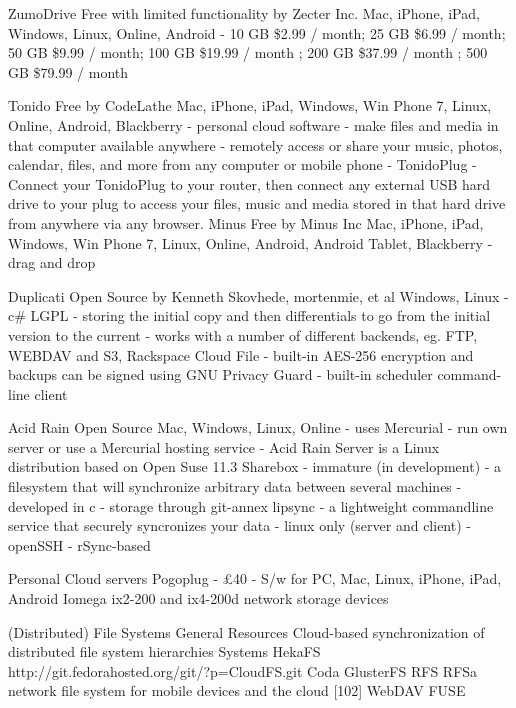 			ZumoDrive
				Free with limited functionality by Zecter Inc.
				Mac, iPhone, iPad, Windows, Linux, Online, Android
				- 10 GB \$2.99 / month; 25 GB \$6.99 / month; 50 GB \$9.99 / month; 100 GB \$19.99 / month ; 200 GB \$37.99 / month ; 500 GB 	\$79.99 / month
				
			Tonido
				Free by CodeLathe 
				Mac, iPhone, iPad, Windows, Win Phone 7, Linux, Online, Android, Blackberry
				- personal cloud software
				- make files and media in that computer available anywhere 
				- remotely access or share your music, photos, calendar, files, and more from any computer or mobile phone
				- TonidoPlug
					- Connect your TonidoPlug to your router, then connect any external USB hard drive to your plug to access your files, music and media stored in that hard drive from anywhere via any browser.
			Minus
				Free by Minus Inc 
				Mac, iPhone, iPad, Windows, Win Phone 7, Linux, Online, Android, Android Tablet, Blackberry  
				- drag and drop
				
			Duplicati
				Open Source by Kenneth Skovhede, mortenmie, et al 
				Windows, Linux 
				- c#
				LGPL
				- storing the initial copy and then differentials to go from the initial version to the current
				- works with a number of different backends, eg. FTP, WEBDAV and S3, Rackspace Cloud File
				- built-in AES-256 encryption and backups can be signed using GNU Privacy Guard
				- built-in scheduler
				command-line client
				
			Acid Rain
				Open Source
				Mac, Windows, Linux, Online 
				- uses Mercurial 
					- run own server or use a Mercurial hosting service
				- Acid Rain Server is a Linux distribution based on Open Suse 11.3
			Sharebox
				- immature (in development)
				- a filesystem that will synchronize arbitrary data between several machines
				- developed in c
				- storage through git-annex
			lipsync
				- a lightweight commandline service that securely syncronizes your data 
				- linux only (server and client)
				- openSSH
				- rSync-based
				
		Personal Cloud servers		
			Pogoplug
				- £40
				- S/w for PC, Mac, Linux, iPhone, iPad, Android
			Iomega
				ix2-200 and ix4-200d network storage devices

	(Distributed) File Systems
		General Resources
			Cloud-based synchronization of distributed file system hierarchies
		Systems
			HekaFS
			http://git.fedorahosted.org/git/?p=CloudFS.git 
			Coda
			GlusterFS
			RFS
				RFSa network file system for mobile devices and the cloud [102]
		WebDAV 
		FUSE		

